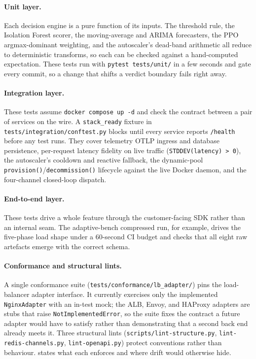\paragraph{Unit layer.} Each decision engine is a pure function of its inputs. The
threshold rule, the Isolation Forest scorer, the moving-average and ARIMA forecasters,
the PPO argmax-dominant weighting, and the autoscaler's dead-band arithmetic all reduce
to deterministic transforms, so each can be checked against a hand-computed
expectation. These tests run with \texttt{pytest tests/unit/} in a few seconds and gate
every commit, so a change that shifts a verdict boundary fails right away.

\paragraph{Integration layer.} These tests assume \texttt{docker compose up -d} and
check the contract between a pair of services on the wire. A \texttt{stack\_ready}
fixture in \texttt{tests/integration/conftest.py} blocks until every service reports
\texttt{/health} before any test runs. They cover telemetry OTLP ingress and database
persistence, per-request latency fidelity on live traffic (\texttt{STDDEV(latency) >
0}), the autoscaler's cooldown and reactive fallback, the dynamic-pool
\texttt{provision()}/\texttt{decommission()} lifecycle against the live Docker daemon,
and the four-channel closed-loop dispatch.

\paragraph{End-to-end layer.} These tests drive a whole feature through the
customer-facing SDK rather than an internal seam. The adaptive-bench compressed run,
for example, drives the five-phase load shape under a 60-second CI budget and checks
that all eight raw artefacts emerge with the correct schema.

\paragraph{Conformance and structural lints.} A single conformance suite
(\texttt{tests/\allowbreak conformance/\allowbreak lb\_\allowbreak adapter/}) pins the load-balancer adapter
interface. It currently exercises only the implemented \texttt{NginxAdapter} with an
in-test mock; the ALB, Envoy, and HAProxy adapters are stubs that raise
\texttt{NotImplementedError}, so the suite fixes the contract a future adapter would
have to satisfy rather than demonstrating that a second back end already meets it.
Three structural lints
(\texttt{scripts/\allowbreak lint-\allowbreak structure.py}, \texttt{lint-\allowbreak redis-\allowbreak channels.py},
\texttt{lint-\allowbreak openapi.py}) protect conventions rather than behaviour.
 states what each enforces and where drift would otherwise hide.

